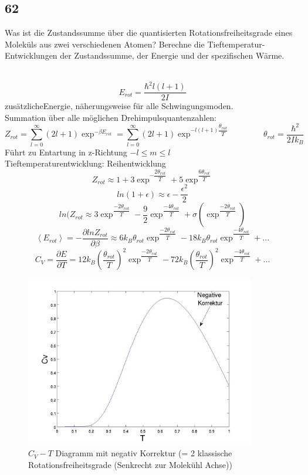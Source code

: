 \subsection{62}
\begin{myfrag}
Was ist die Zustandssumme über die quantisierten Rotationsfreiheitsgrade
eines Moleküls aus zwei verschiedenen Atomen? Berechne die
Tieftemperatur-Entwicklungen der Zustandssumme, der Energie und der
spezifischen Wärme.
\end{myfrag} \quad \\
$$ E_{rot} = \dfrac{\hbar ^2 l(l+1)}{2I}$$
\glqq zusätzliche\grqq Energie, näherungsweise für alle Schwingungsmoden. \\
Summation über alle möglichen Drehimpulsquantenzahlen:
$$ Z_{rot} = \sum \limits _{l=0}^\infty (2l+1) \exp ^{-\beta E_{rot} } = \sum \limits _{l=0} ^\infty (2l+1) \exp ^{-l(l+1)\dfrac{\theta _{rot}}{T}} \qquad \qquad \theta _{rot} = \dfrac{\hbar ^2}{2Ik_B} $$
Führt zu Entartung in z-Richtung $-l \leqslant m \leqslant l$ \\[1.5ex]
Tieftemperaturentwicklung: Reihentwicklung
$$ Z_{rot} \approx 1 + 3 \exp ^{- \dfrac{2 \theta _{rot}}{T}}+5 \exp ^{\dfrac{6 \theta _{rot}}{T}}$$
$$ ln(1+\epsilon) \approx \epsilon -\dfrac{\epsilon^2}{2}$$
$$ln(Z_{rot} \approx 3 \exp ^{\dfrac{-2 \theta _{rot}}{T}} - \dfrac{9}{2} \exp ^{\dfrac{-4 \theta _{rot}}{T}} + \sigma \left( \exp ^{\dfrac{-2 \theta _{rot}}{T}} \right)$$
$$\left\langle E_{rot} \right\rangle = - \dfrac{\partial lnZ_{rot}}{\partial \beta} \approx 6k_B \theta_{rot} \exp ^{\dfrac{-2 \theta _{rot}}{T}} - 18k_B \theta_{rot}\exp ^{\dfrac{-4 \theta _{rot}}{T}} + ...$$
$$C_V = \dfrac{\partial E}{\partial T} = 12 k_B \left( \dfrac{\theta_{rot}}{T}\right) ^2 \exp ^{\dfrac{-2 \theta _{rot}}{T}} - 72k_B \left( \dfrac{\theta_{rot}}{T}\right) ^2 \exp ^{\dfrac{-4 \theta _{rot}}{T}} + ...$$
\begin{figure}
\begin{center}
\includegraphics[width= 10cm]{Bilder/Frage62.jpg} 
\caption{$C_V-T$ Diagramm mit negativ Korrektur (= 2 klassische Rotationsfreiheitsgrade (Senkrecht zur Molekühl Achse)) }
\end{center}
\end{figure}
